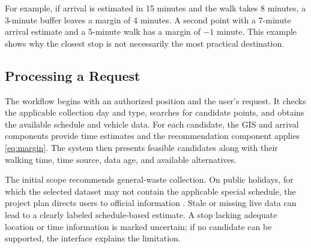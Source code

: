 For example, if arrival is estimated in 15 minutes and the walk takes 8 minutes, a 3-minute buffer leaves a margin of 4 minutes. A second point with a 7-minute arrival estimate and a 5-minute walk has a margin of $-1$ minute. This example shows why the closest stop is not necessarily the most practical destination.

\subsection{Processing a Request}
The workflow begins with an authorized position and the user's request. It checks the applicable collection day and type, searches for candidate points, and obtains the available schedule and vehicle data. For each candidate, the GIS and arrival components provide time estimates and the recommendation component applies \eqref{eq:margin}. The system then presents feasible candidates along with their walking time, time source, data age, and available alternatives.

The initial scope recommends general-waste collection. On public holidays, for which the selected dataset may not contain the applicable special schedule, the project plan directs users to official information \cite{tcepb_holiday}. Stale or missing live data can lead to a clearly labeled schedule-based estimate. A stop lacking adequate location or time information is marked uncertain; if no candidate can be supported, the interface explains the limitation.
